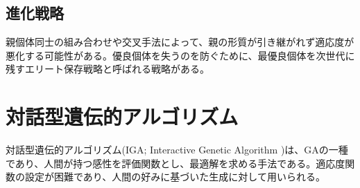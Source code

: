 \subsection{進化戦略}
親個体同士の組み合わせや交叉手法によって、親の形質が引き継がれず適応度が悪化する可能性がある。優良個体を失うのを防ぐために、最優良個体を次世代に残すエリート保存戦略と呼ばれる戦略がある。

\section{対話型遺伝的アルゴリズム}
対話型遺伝的アルゴリズム(IGA; Interactive Genetic Algorithm )は、GAの一種であり、人間が持つ感性を評価関数とし、最適解を求める手法である。適応度関数の設定が困難であり、人間の好みに基づいた生成に対して用いられる。